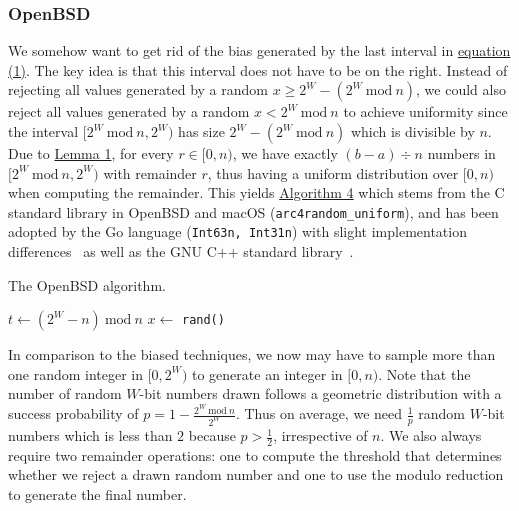 \documentclass[a4paper, UKenglish, cleveref, autoref, thm-restate]{lipics-v2021}
\newcommand{\Mod}[1]{\ \mathrm{mod}\ #1}
\begin{document}
\subsubsection{OpenBSD}\label{sec:2.2.1}
We somehow want to get rid of the bias generated by the last interval in \hyperref[eq:1]{equation (1)}.
The key idea is that this interval does not have to be on the right.
Instead of rejecting all values generated by a random $x \geq 2^W - (2^W \Mod n)$, we could also reject all values generated by a random $x < 2^W \Mod n$ to achieve uniformity since the interval $[2^W \Mod n, 2^W)$ has size $2^W - (2^W \Mod n)$ which is divisible by $n$.
Due to \hyperref[lemma:1]{Lemma 1}, for every $r \in [0,n)$, we have exactly $(b - a) \div n$ numbers in $[2^W \Mod n,2^W)$ with remainder $r$, thus having a uniform distribution over $[0,n)$ when computing the remainder.
This yields \hyperref[alg:openbsd]{Algorithm 4} which stems from the C standard library in OpenBSD and macOS (\texttt{arc4random\_uniform}), and has been adopted by the Go language (\texttt{Int63n, Int31n}) with slight implementation differences~\cite{GoLang} as well as the GNU C++ standard library~\cite{GnuCpp}.

\begin{algorithm}[!htb] \label{alg:openbsd}
    \caption{The OpenBSD algorithm.}
    \Require{source of uniformly-distributed random integers in $[0,2^W)$ given by \texttt{rand()}}
    $t \leftarrow \left(2^W - n\right) \Mod n$\tcc*[r]{$ \left(2^W - n\right) \Mod n \equiv 2^W \Mod n$}
    $x \leftarrow$ \texttt{rand()}\;
    \KwRet{$x \Mod n$}\;
\end{algorithm}

In comparison to the biased techniques, we now may have to sample more than one random integer in $[0,2^W)$ to generate an integer in $[0,n)$.
Note that the number of random $W$-bit numbers drawn follows a geometric distribution with a success probability of $p = 1 - \frac{2^W \Mod n}{2^W}$.
Thus on average, we need $\frac{1}{p}$ random $W$-bit numbers which is less than $2$ because $p > \frac{1}{2}$, irrespective of $n$.
We also always require two remainder operations: one to compute the threshold that determines whether we reject a drawn random number and one to use the modulo reduction to generate the final number.
\end{document}
